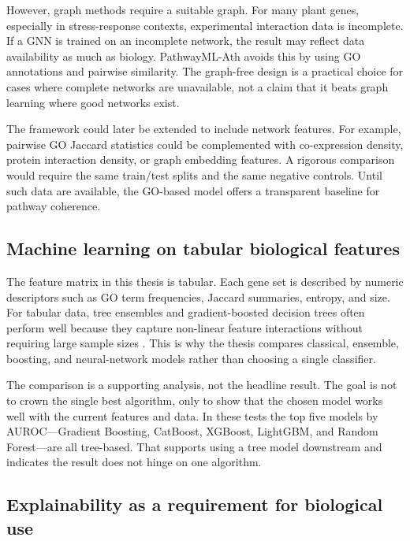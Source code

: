 \documentclass[12pt,twoside]{article}
\begin{document}
However, graph methods require a suitable graph. For many plant genes, especially in stress-response contexts, experimental interaction data is incomplete. If a GNN is trained on an incomplete network, the result may reflect data availability as much as biology. PathwayML-Ath avoids this by using GO annotations and pairwise similarity. The graph-free design is a practical choice for cases where complete networks are unavailable, not a claim that it beats graph learning where good networks exist.

The framework could later be extended to include network features. For example, pairwise GO Jaccard statistics could be complemented with co-expression density, protein interaction density, or graph embedding features. A rigorous comparison would require the same train/test splits and the same negative controls. Until such data are available, the GO-based model offers a transparent baseline for pathway coherence.

\subsection{Machine learning on tabular biological features}
\label{sec:lit_tabular_extended}

The feature matrix in this thesis is tabular. Each gene set is described by numeric descriptors such as GO term frequencies, Jaccard summaries, entropy, and size. For tabular data, tree ensembles and gradient-boosted decision trees often perform well because they capture non-linear feature interactions without requiring large sample sizes \citep{breiman2001random,friedman2001greedy,chen2016xgboost,ke2017lightgbm,prokhorenkova2018catboost,grinsztajn2022why}. This is why the thesis compares classical, ensemble, boosting, and neural-network models rather than choosing a single classifier.

The comparison is a supporting analysis, not the headline result. The goal is not to crown the single best algorithm, only to show that the chosen model works well with the current features and data. In these tests the top five models by AUROC---Gradient Boosting, CatBoost, XGBoost, LightGBM, and Random Forest---are all tree-based. That supports using a tree model downstream and indicates the result does not hinge on one algorithm.

\subsection{Explainability as a requirement for biological use}
\label{sec:lit_xai_extended}
\end{document}
